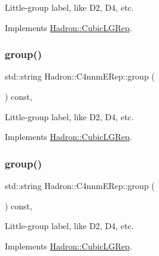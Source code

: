 Little-\/group label, like D2, D4, etc. 

Implements \mbox{\hyperlink{structHadron_1_1CubicLGRep_a9bdb14b519a611d21379ed96a3a9eb41}{Hadron\+::\+Cubic\+L\+G\+Rep}}.

\mbox{\label{structHadron_1_1C4nnmERep_a45a936a694de501cfdb433b97302755a}} 
\subsubsection{\texorpdfstring{group()}{group()}\hspace{0.1cm}{\footnotesize\ttfamily [2/3]}}
{\footnotesize\ttfamily std\+::string Hadron\+::\+C4nnm\+E\+Rep\+::group (\begin{DoxyParamCaption}{ }\end{DoxyParamCaption}) const\hspace{0.3cm}{\ttfamily [inline]}, {\ttfamily [virtual]}}

Little-\/group label, like D2, D4, etc. 

Implements \mbox{\hyperlink{structHadron_1_1CubicLGRep_a9bdb14b519a611d21379ed96a3a9eb41}{Hadron\+::\+Cubic\+L\+G\+Rep}}.

\mbox{\label{structHadron_1_1C4nnmERep_a45a936a694de501cfdb433b97302755a}} 
\subsubsection{\texorpdfstring{group()}{group()}\hspace{0.1cm}{\footnotesize\ttfamily [3/3]}}
{\footnotesize\ttfamily std\+::string Hadron\+::\+C4nnm\+E\+Rep\+::group (\begin{DoxyParamCaption}{ }\end{DoxyParamCaption}) const\hspace{0.3cm}{\ttfamily [inline]}, {\ttfamily [virtual]}}

Little-\/group label, like D2, D4, etc. 

Implements \mbox{\hyperlink{structHadron_1_1CubicLGRep_a9bdb14b519a611d21379ed96a3a9eb41}{Hadron\+::\+Cubic\+L\+G\+Rep}}.

\mbox{\label{structHadron_1_1C4nnmERep_af7b1046412f5b815c19810b47eb8686d}} 
